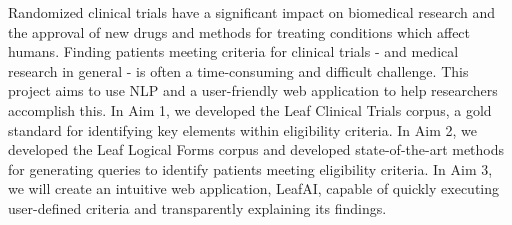 \documentclass[../main.tex]{subfiles}
\begin{document}
Randomized clinical trials have a significant impact on biomedical research and the approval of new drugs and methods for treating conditions which affect humans. Finding patients meeting criteria for clinical trials - and medical research in general - is often a time-consuming and difficult challenge. This project aims to use NLP and a user-friendly web application to help researchers accomplish this. In Aim 1, we developed the Leaf Clinical Trials corpus, a gold standard for identifying key elements within eligibility criteria. In Aim 2, we developed the Leaf Logical Forms corpus and developed state-of-the-art methods for generating queries to identify patients meeting eligibility criteria. In Aim 3, we will create an intuitive web application, LeafAI, capable of quickly executing user-defined criteria and transparently explaining its findings.
\end{document}
